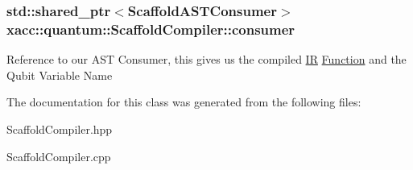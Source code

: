 \subsubsection[{\texorpdfstring{consumer}{consumer}}]{\setlength{\rightskip}{0pt plus 5cm}std\+::shared\+\_\+ptr$<${\bf Scaffold\+A\+S\+T\+Consumer}$>$ xacc\+::quantum\+::\+Scaffold\+Compiler\+::consumer\hspace{0.3cm}{\ttfamily [protected]}}\hypertarget{a00077_ab1c4d36e58b97de50208e74a92d8ceb1}{}\label{a00077_ab1c4d36e58b97de50208e74a92d8ceb1}
Reference to our A\+ST Consumer, this gives us the compiled \hyperlink{a00050}{IR} \hyperlink{a00038}{Function} and the Qubit Variable Name 

The documentation for this class was generated from the following files\+:\begin{DoxyCompactItemize}
\item 
Scaffold\+Compiler.\+hpp\item 
Scaffold\+Compiler.\+cpp\end{DoxyCompactItemize}
